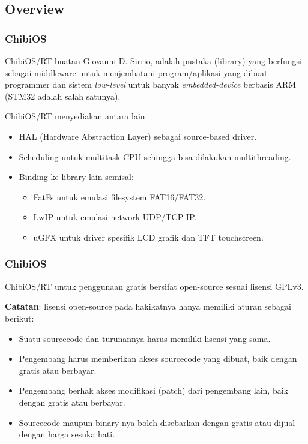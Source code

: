 \documentclass[table,dvipsnames]{beamer}
\begin{document}
	\subsection{Overview}
	\begin{frame}
		\frametitle{ChibiOS}
		\begin{exampleblock}{}
			ChibiOS/RT buatan Giovanni D. Sirrio, adalah pustaka (library) yang berfungsi sebagai middleware untuk menjembatani program/aplikasi yang dibuat programmer
			dan sistem \textit{low-level} untuk banyak \textit{embedded-device} berbasis ARM (STM32 adalah salah satunya).
		\end{exampleblock}

		\begin{exampleblock}{}
			ChibiOS/RT menyediakan antara lain:
			\begin{itemize}
				\item HAL (Hardware Abstraction Layer) sebagai source-based driver.
				\item Scheduling untuk multitask CPU sehingga bisa dilakukan multithreading.
				\item Binding ke library lain semisal:
				\begin{itemize}
					\item FatFs untuk emulasi filesystem FAT16/FAT32.
					\item LwIP untuk emulasi network UDP/TCP IP.
					\item uGFX untuk driver spesifik LCD grafik dan TFT touchscreen.
				\end{itemize}
			\end{itemize}
		\end{exampleblock}
	\end{frame}

	\begin{frame}
		\frametitle{ChibiOS}
		\begin{exampleblock}{}
			ChibiOS/RT untuk penggunaan gratis bersifat open-source sesuai lisensi GPLv3.
		\end{exampleblock}

		\begin{exampleblock}{}
			\textbf{Catatan}: lisensi open-source pada hakikatnya hanya memiliki aturan sebagai berikut:
			\begin{itemize}
				\item Suatu sourcecode dan turunannya harus memiliki lisensi yang sama.
				\item Pengembang harus memberikan akses sourcecode yang dibuat, baik dengan gratis atau berbayar.
				\item Pengembang berhak akses modifikasi (patch) dari pengembang lain, baik dengan gratis atau berbayar.
				\item Sourcecode maupun binary-nya boleh disebarkan dengan gratis atau dijual dengan harga sesuka hati.
			\end{itemize}
		\end{exampleblock}
	\end{frame}
\end{document}
